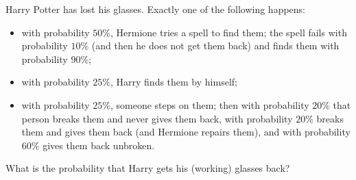 Harry Potter has lost his glasses. Exactly one of the following happens:
\begin{itemize}
\item with probability $50\%$, Hermione tries a spell to find them; the spell fails with probability $10\%$ (and then he does not get them back) and finds them with probability $90\%$;
\item with probability $25\%$, Harry finds them by himself;
\item with probability $25\%$, someone steps on them; then with probability $20\%$ that person breaks them and never gives them back, with probability $20\%$ breaks them and gives them back (and Hermione repairs them), and with probability $60\%$ gives them back unbroken.
\end{itemize}
What is the probability that Harry gets his (working) glasses back?

